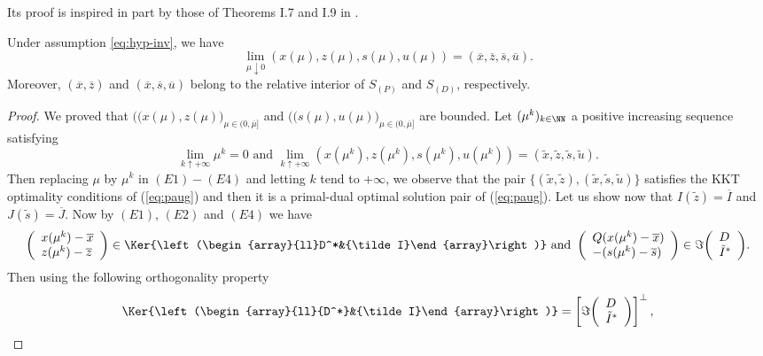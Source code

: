Its proof is inspired in part by those of Theorems I.7 and I.9 in \cite{RoTevi}.
\begin{theorem}\label{thm:convergence}
Under assumption \ref{eq:hyp-inv}, we have $$\lim\limits_{\mu\downarrow0}(x(\mu),z(\mu),s(\mu),u(\mu))=({\overline x},{\overline z},{\overline s},{\overline u}).$$ Moreover, $({\overline x},{\overline z})$  and $({\overline x},{\overline s},{\overline u})$ belong to the relative interior of $S_{(P)}$ and $S_{(D)}$, respectively. 
\end{theorem}

\begin{proof}
We proved that $\big((x(\mu),z(\mu)\big)_{\mu\in(0,\overline{\mu}]}$ and $\big((s(\mu),u(\mu)\big)_{\mu\in(0,\overline{\mu}]}$ are bounded. Let $(\mu^k)_{k\in \NN}$ a positive increasing sequence satisfying $$\lim\limits_{k\uparrow +\infty}\mu^k=0\mbox{ and }\lim\limits_{k\uparrow+\infty}(x(\mu^k),z(\mu^k),s(\mu^k),u(\mu^k))=(\tilde{x},\tilde{z},\tilde{s},\tilde{u}).$$ Then replacing $\mu$ by $\mu^k$ in $(E1)-(E4)$ and letting $k$ tend to $+\infty$, we observe that the pair $\{(\tilde{x},\tilde{z}),(\tilde{x},\tilde{s},\tilde{u})\}$ satisfies the KKT optimality conditions of (\ref{eq:paug}) and then it is a primal-dual optimal solution pair of (\ref{eq:paug}). Let us show now that $I(\tilde{z})=\overline{I}$ and $J(\tilde{s})=\overline{J}$. 
Now by $(E1)$, $(E2)$ and $(E4)$ we have  
$$\left(\begin{array}{l}
x(\mu^k)-\overline{x}\cr
z(\mu^k)-\overline{z}\end{array}\right)\in\Ker{\left(\begin{array}{ll}D^*&{\tilde I}\end{array}\right)}\mbox{ and }
\left(\begin{array}{l}
Q(x(\mu^k)-\overline{x})\cr
-(s(\mu^k)-\overline{s})\end{array}\right)\in\Im{\left(\begin{array}{l}D \\ {\tilde I}^*\end{array}\right)}.
$$
Then using the following orthogonality property 
\begin{equation}
\label{orthogonality}
\Ker{\left(\begin{array}{ll}{D^*}&{\tilde I}\end{array}\right)}=\left[\Im{\left(\begin{array}{l}D \\ {\tilde I}^*\end{array}\right)}\right]^\bot,
\end{equation} 

\end{proof}
